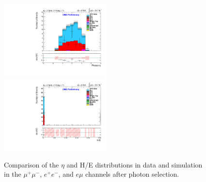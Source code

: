 \documentclass[oneside, a4paper, 11pt, ]{report}
\begin{document}
\begin{figure}
\includegraphics[width=0.5\textwidth]{Plots/ControlPlots/TTbarPhotonAnalysis/EMu/Photons/SignalPhotons/Photon_Eta_splitTTbar_ratio.pdf}
\includegraphics[width=0.5\textwidth]{Plots/ControlPlots/TTbarPhotonAnalysis/EMu/Photons/SignalPhotons/Photon_HtowoE_splitTTbar_ratio.pdf}
\caption{Comparison of the $\eta$ and H/E distributions in data and simulation in the $\mu^{+}\mu^{-}$, $e^{+}e^{-}$, and $e\mu$ channels after photon selection.}
\label{fig-photonEtaAndHoverE}
\end{figure}
\end{document}
